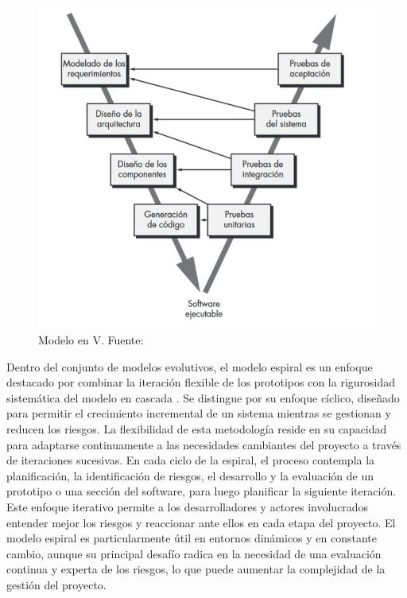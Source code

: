 \begin{figure}[!htb]
	\centering
	\includegraphics[width=\linewidth]{Figures/model-v.png}
	\caption{Modelo en V. Fuente: \cite{pressman2010ingenieria}}
\end{figure}

Dentro del conjunto de modelos evolutivos, el modelo espiral es un enfoque destacado por combinar la iteración flexible de los prototipos con la rigurosidad sistemática del modelo en cascada \cite{pressman2010ingeneria}. Se distingue por su enfoque cíclico, diseñado para permitir el crecimiento incremental de un sistema mientras se gestionan y reducen los riesgos. La flexibilidad de esta metodología reside en su capacidad para adaptarse continuamente a las necesidades cambiantes del proyecto a través de iteraciones sucesivas. En cada ciclo de la espiral, el proceso contempla la planificación, la identificación de riesgos, el desarrollo y la evaluación de un prototipo o una sección del software, para luego planificar la siguiente iteración. Este enfoque iterativo permite a los desarrolladores y actores involucrados entender mejor los riesgos y reaccionar ante ellos en cada etapa del proyecto. El modelo espiral es particularmente útil en entornos dinámicos y en constante cambio, aunque su principal desafío radica en la necesidad de una evaluación continua y experta de los riesgos, lo que puede aumentar la complejidad de la gestión del proyecto.

